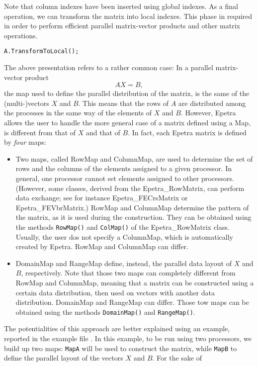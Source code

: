 Note that column indexes have been inserted using global indexes.
As a final operation, we can transform the matrix into local
indexes. This phase in required in order to perform efficient parallel
matrix-vector products and other matrix operations.
\begin{verbatim}
A.TransformToLocal();
\end{verbatim}

The above presentation refers to a rather common case: In a parallel
matrix-vector product
\[
A X = B ,
\]
the map used to define the parallel distribution of the matrix, is the
same of the (multi-)vectors $X$ and $B$.  This means that the rows of
$A$ are distributed among the processes in the same way of the elements
of $X$ and $B$.  However, Epetra allows the user to handle the more
general case of a matrix defined using a Map, is different from that of
$X$ and that of $B$. In fact, each Epetra matrix is defined by {\sl
  four} maps:
\begin{itemize}
\item Two maps, called RowMap and ColumnMap, are used to determine the
  set of rows and the columns of the elements assigned to a given
  processor. In general, one processor cannot set elements assigned to
  other processors.  (However, some classes, derived from the
  Epetra\_RowMatrix, can perform data exchange; see for instance
  Epetra\_FECrsMatrix or Epetra\_FEVbrMatrix.) RowMap and ColumnMap
  determine the pattern of the matrix, as it is used during the
  construction. They can be obtained using the methods \verb!RowMap()!
  and \verb!ColMap()! of the Epetra\_RowMatrix class. Usually, the user
  dos not specify a ColumnMap, which is automatically created by Epetra.
  RowMap and ColumnMap can differ.
\item DomainMap and RangeMap define, instead, the parallel data layout
  of $X$ and $B$, respectively. Note that those two maps can completely
  different from RowMap and ColumnMap, meaning that a matrix can be
  constructed using a certain data distribution, then used on vectors
  with another data distribution. DomainMap and RangeMap can
  differ. Those tow maps can be obtained using the methods
  \verb!DomainMap()! and \verb!RangeMap()!.
\end{itemize}
The potentialities of this approach are better explained using an
example, reported in the example file . In this
example, to be run using two processors, we build up two maps:
\verb!MapA! will be used to construct the matrix, while \verb!MapB! to
define the parallel layout of the vectors $X$ and $B$. For the sake of
